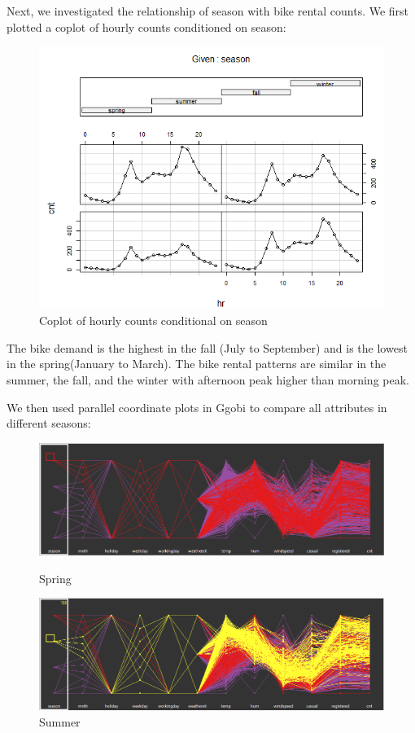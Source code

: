 \documentclass[12pt]{article}
\begin{document}
	Next, we investigated the relationship of season with bike rental counts. We first plotted a coplot of hourly counts conditioned on season:
	
		\begin{figure}[H]
			\centering
			\includegraphics[width=\linewidth]{figures/coplot_season.png}
			\caption{Coplot of hourly counts conditional on season}
		\end{figure}
	
	 The bike demand is the highest in the fall (July to September) and is the lowest in the spring(January to March). The bike rental patterns are similar in the summer, the fall, and the winter with afternoon peak higher than morning peak. 
	 
	 We then used parallel coordinate plots in Ggobi to compare all attributes in different seasons:
	 
	 \begin{figure}[H]
	 	\centering
	 	\begin{minipage}{.5\textwidth}
	 		\centering
	 		\includegraphics[width=\linewidth]{figures/spring_pcor.png}
	 		\caption{Spring}
	 	\end{minipage}%
	 	\begin{minipage}{.5\textwidth}
	 		\centering
	 		\includegraphics[width=\linewidth]{figures/summer_pcor.png}
	 		\caption{Summer}
	 	\end{minipage}
	 \end{figure}
	 
\end{document}
